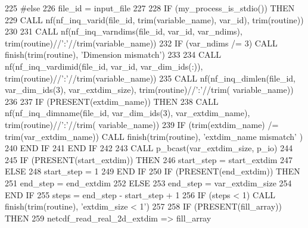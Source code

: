 \begin{DoxyCode}
225 \textcolor{preprocessor}{#else}
226 \textcolor{preprocessor}{}      file\_id = input\_file%
227 
228       \textcolor{keywordflow}{IF} (my\_process\_is\_stdio()) \textcolor{keywordflow}{THEN}
229         \textcolor{keyword}{CALL }nf(nf\_inq\_varid(file\_id, trim(variable\_name), var\_id), trim(routine))
230 
231         \textcolor{keyword}{CALL }nf(nf\_inq\_varndims(file\_id, var\_id, var\_ndims), trim(routine)//\textcolor{stringliteral}{':'}//trim(variable\_name))
232         \textcolor{keywordflow}{IF} (var\_ndims /= 3) \textcolor{keyword}{CALL }finish(trim(routine), \textcolor{stringliteral}{'Dimension mismatch'})
233 
234         \textcolor{keyword}{CALL }nf(nf\_inq\_vardimid(file\_id, var\_id, var\_dim\_ids(:)), trim(routine)//\textcolor{stringliteral}{':'}//trim(variable\_name))
235         \textcolor{keyword}{CALL }nf(nf\_inq\_dimlen(file\_id, var\_dim\_ids(3), var\_extdim\_size), trim(routine)//\textcolor{stringliteral}{':'}//trim(
      variable\_name))
236 
237         \textcolor{keywordflow}{IF} (\textcolor{keyword}{PRESENT}(extdim\_name)) \textcolor{keywordflow}{THEN}
238           \textcolor{keyword}{CALL }nf(nf\_inq\_dimname(file\_id, var\_dim\_ids(3), var\_extdim\_name), trim(routine)//\textcolor{stringliteral}{':'}//trim(
      variable\_name))
239           \textcolor{keywordflow}{IF} (trim(extdim\_name) /= trim(var\_extdim\_name)) \textcolor{keyword}{CALL }finish(trim(routine), \textcolor{stringliteral}{'extdim\_name mismatch'}
      )
240 \textcolor{keywordflow}{        END IF}
241 \textcolor{keywordflow}{      END IF}
242 
243       \textcolor{keyword}{CALL }p\_bcast(var\_extdim\_size, p\_io)
244 
245       \textcolor{keywordflow}{IF} (\textcolor{keyword}{PRESENT}(start\_extdim)) \textcolor{keywordflow}{THEN}
246         start\_step = start\_extdim
247       \textcolor{keywordflow}{ELSE}
248         start\_step = 1
249 \textcolor{keywordflow}{      END IF}
250       \textcolor{keywordflow}{IF} (\textcolor{keyword}{PRESENT}(end\_extdim)) \textcolor{keywordflow}{THEN}
251 \textcolor{keyword}{        end}\_step = end\_extdim
252       \textcolor{keywordflow}{ELSE}
253 \textcolor{keyword}{        end}\_step = var\_extdim\_size
254 \textcolor{keywordflow}{      END IF}
255       steps = end\_step - start\_step + 1
256       \textcolor{keywordflow}{IF} (steps < 1) \textcolor{keyword}{CALL }finish(trim(routine), \textcolor{stringliteral}{'extdim\_size < 1'})
257 
258       \textcolor{keywordflow}{IF} (\textcolor{keyword}{PRESENT}(fill\_array)) \textcolor{keywordflow}{THEN}
259         netcdf\_read\_real\_2d\_extdim => fill\_array

\end{DoxyCode}
